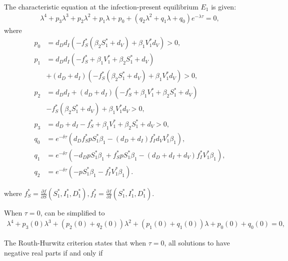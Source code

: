 \documentclass{CMHPhD-SIVD}
\begin{document}
The characteristic equation at the infection-present equilibrium $E_1$ is given:
\begin{equation}\label{9}
   \begin{array}{ll}
    \lambda^4+p_3 \lambda^3+p_2 \lambda^2+p_1 \lambda+p_0+(q_2 \lambda^2+q_1 \lambda+q_0)e^{-\lambda \tau}=0,
   \end{array}
\end{equation}
where
\begin{align*}
p_0&=d_D d_I\left(-f_S^*(\beta_2 S_1^*+d_{V})+ \beta_1 V_1^*d_V\right)>0,\\
p_1&=d_D d_I \left(-f_S^* + \beta_1 V_1^*+\beta_2 S_1^*+d_{V}\right) \nonumber \\
& + (d_D + d_I) \left(-f_S^*(\beta_2 S_1^*+d_{V})+ \beta_1 V_1^*d_V\right)>0, \\
p_2&=d_D d_I + (d_D+ d_I) \left(-f_S^*+ \beta_1 V_1^*+\beta_2 S_1^*+d_{V}\right)\nonumber \\
&-f_S^*(\beta_2 S_1^*+d_{V}) + \beta_1 V_1^* d_V>0, \\
p_3&=d_D + d_I -f_S^*+ \beta_1 V_1^* + \beta_2 S_1^*+d_{V}>0, \\
q_0&=e^{-\delta\tau}\left(d_D f_S^* p S_1^* \beta_1 - (d_D+ d_I)f_I^* d_V V_1^* \beta_1\right),\\
q_1&=e^{-\delta\tau}\left(-d_D p S_1^* \beta_1+f_S^* p S_1^* \beta_1 - (d_D+
d_I+d_V) f_I^* V_1^* \beta_1\right),\\
q_2&=e^{-\delta\tau}\left(-p S_1^* \beta_1-f_I^* V_1^* \beta_1\right).
\end{align*}

where $f_S^*=\frac{\partial f}{\partial S}(S_1^*, I_1^*, D_1^*), f_I^*=\frac{\partial f}{\partial I}(S_1^*, I_1^*, D_1^*).$




When $\tau=0$,  can be simplified to
\begin{equation}\label{10}
   \begin{array}{ll}
    \lambda^4+p_3(0) \lambda^3+(p_2(0) + q_2(0)) \lambda^2+(p_1(0) + q_1(0)) \lambda+p_0(0) +q_0(0)=0,
   \end{array}
\end{equation}

The Routh-Hurwitz criterion states that when $\tau=0$, all solutions to  have negative real parts if and only if
\end{document}
